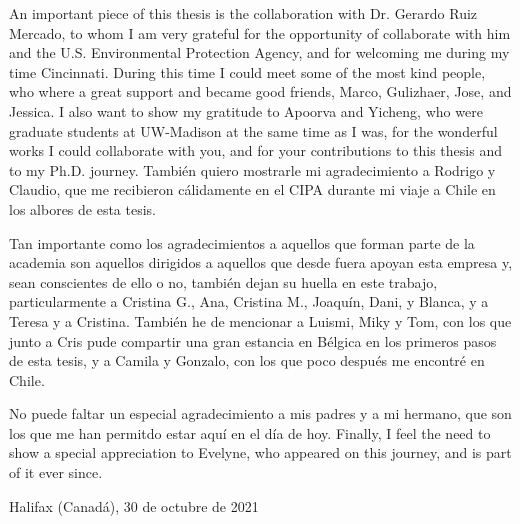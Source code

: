 An important piece of this thesis is the collaboration with Dr. Gerardo Ruiz Mercado, to whom I am very grateful for the opportunity of collaborate with him and the U.S. Environmental Protection Agency, and for welcoming me during my time Cincinnati. During this time I could meet some of the most kind people, who where a great support and became good friends, Marco, Gulizhaer, Jose, and Jessica. I also want to show my gratitude to Apoorva and Yicheng, who were graduate students at UW-Madison at the same time as I was, for the wonderful works I could collaborate with you, and for your contributions to this thesis and to my Ph.D. journey. También quiero mostrarle mi agradecimiento a Rodrigo y Claudio, que me recibieron cálidamente en el CIPA durante mi viaje a Chile en los albores de esta tesis. 

Tan importante como los agradecimientos a aquellos que forman parte de la academia son aquellos dirigidos a aquellos que desde fuera apoyan esta empresa y, sean conscientes de ello o no, tambi\'{e}n dejan su huella en este trabajo, particularmente a Cristina G., Ana, Cristina M., Joaquín, Dani, y Blanca, y a Teresa y a Cristina. También he de mencionar a Luismi, Miky y Tom, con los que junto a Cris pude compartir una gran estancia en Bélgica en los primeros pasos de esta tesis, y a Camila y Gonzalo, con los que poco despu\'{e}s me encontré en Chile. 

No puede faltar un especial agradecimiento a mis padres y a mi hermano, que son los que me han permitdo estar aquí en el día de hoy. Finally, I feel the need to show a special appreciation to Evelyne, who appeared on this journey, and is part of it ever since.

\bigskip

\hspace*{\fill} Halifax (Canadá), 30 de octubre de 2021

\endgroup
